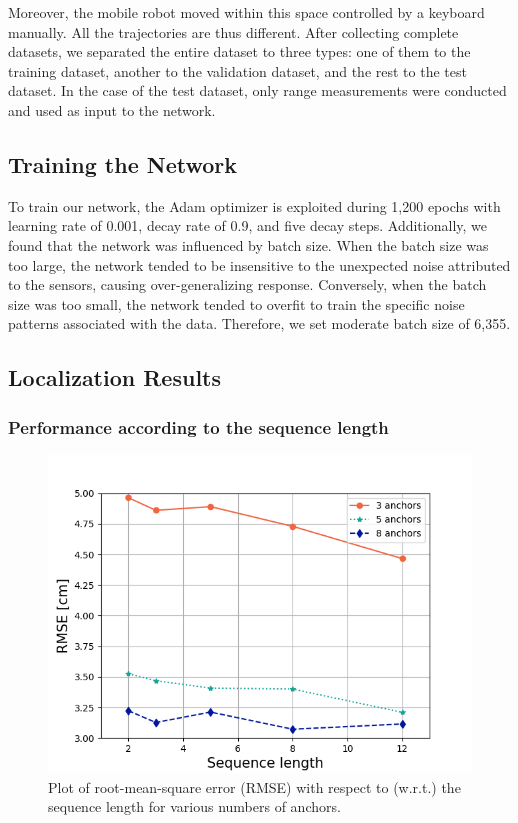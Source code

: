 \documentclass[letterpaper, 10 pt, conference]{ieeeconf}
\begin{document}
Moreover, the mobile robot moved within this space controlled by a keyboard manually. All the trajectories are thus different. After collecting complete datasets, we separated the entire dataset to three types: one of them to the training dataset, another to the validation dataset, and the rest to the test dataset. In the case of the test dataset, only range measurements were conducted and used as input to the network.

\subsection{Training the Network}

To train our network, the Adam optimizer is exploited during 1,200 epochs with learning rate of 0.001, decay rate of 0.9, and five decay steps. Additionally, we found that the network was influenced by batch size. When the batch size was too large, the network tended to be insensitive to the unexpected noise attributed to the sensors, causing over-generalizing response. Conversely, when the batch size was too small, the network tended to overfit to train the specific noise patterns associated with the data. Therefore, we set moderate batch size of 6,355.

\subsection{Localization Results}

\subsubsection{Performance according to the sequence length}

\begin{figure}[h!]
	\centering
	\includegraphics[width=0.9\linewidth]{image/RMSE_error}
	\caption{Plot of root-mean-square error (RMSE) with respect to (w.r.t.) the sequence length for various numbers of anchors.}
	\label{fig:seq_length_on_different_anchors} 	
\end{figure}
\end{document}
